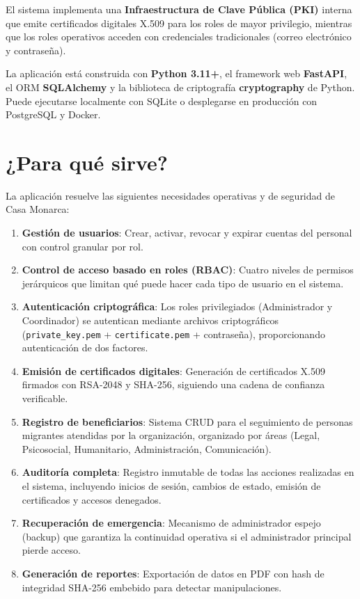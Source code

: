 \documentclass[10pt,letterpaper]{report}
\begin{document}
El sistema implementa una \textbf{Infraestructura de Clave Pública (PKI)} interna que emite certificados digitales X.509 para los roles de mayor privilegio, mientras que los roles operativos acceden con credenciales tradicionales (correo electrónico y contraseña).

La aplicación está construida con \textbf{Python 3.11+}, el framework web \textbf{FastAPI}, el ORM \textbf{SQLAlchemy} y la biblioteca de criptografía \textbf{cryptography} de Python. Puede ejecutarse localmente con SQLite o desplegarse en producción con PostgreSQL y Docker.

\section{¿Para qué sirve?}

La aplicación resuelve las siguientes necesidades operativas y de seguridad de Casa Monarca:

\begin{enumerate}[leftmargin=2cm]
  \item \textbf{Gestión de usuarios}: Crear, activar, revocar y expirar cuentas del personal con control granular por rol.
  \item \textbf{Control de acceso basado en roles (RBAC)}: Cuatro niveles de permisos jerárquicos que limitan qué puede hacer cada tipo de usuario en el sistema.
  \item \textbf{Autenticación criptográfica}: Los roles privilegiados (Administrador y Coordinador) se autentican mediante archivos criptográficos (\texttt{private\_key.pem} + \texttt{certificate.pem} + contraseña), proporcionando autenticación de dos factores.
  \item \textbf{Emisión de certificados digitales}: Generación de certificados X.509 firmados con RSA-2048 y SHA-256, siguiendo una cadena de confianza verificable.
  \item \textbf{Registro de beneficiarios}: Sistema CRUD para el seguimiento de personas migrantes atendidas por la organización, organizado por áreas (Legal, Psicosocial, Humanitario, Administración, Comunicación).
  \item \textbf{Auditoría completa}: Registro inmutable de todas las acciones realizadas en el sistema, incluyendo inicios de sesión, cambios de estado, emisión de certificados y accesos denegados.
  \item \textbf{Recuperación de emergencia}: Mecanismo de administrador espejo (backup) que garantiza la continuidad operativa si el administrador principal pierde acceso.
  \item \textbf{Generación de reportes}: Exportación de datos en PDF con hash de integridad SHA-256 embebido para detectar manipulaciones.
\end{enumerate}
\end{document}
